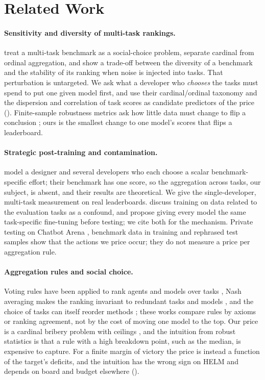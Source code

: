 \section{Related Work}
\label{sec:related}

\paragraph{Sensitivity and diversity of multi-task rankings.}
\citet{zhang2024diversity} treat a multi-task benchmark as a social-choice problem, separate cardinal from ordinal aggregation, and show a trade-off between the diversity of a benchmark and the stability of its ranking when noise is injected into tasks. That perturbation is untargeted. We ask what a developer who \emph{chooses} the tasks must spend to put one given model first, and use their cardinal/ordinal taxonomy and the dispersion and correlation of task scores as candidate predictors of the price (). Finite-sample robustness metrics ask how little data must change to flip a conclusion \citep{broderick2020dropping}; ours is the smallest change to one model's scores that flips a leaderboard.

\paragraph{Strategic post-training and contamination.}
\citet{chen2026incentives} model a designer and several developers who each choose a scalar benchmark-specific effort; their benchmark has one score, so the aggregation across tasks, our subject, is absent, and their results are theoretical. We give the single-developer, multi-task measurement on real leaderboards. \citet{dominguez2024testtask} discuss training on data related to the evaluation tasks as a confound, and \citet{zhang2025trainbeforetest} propose giving every model the same task-specific fine-tuning before testing; we cite both for the mechanism. Private testing on Chatbot Arena \citep{singh2025illusion}, benchmark data in training \citep{zhou2023cheater} and rephrased test samples \citep{yang2023rephrased} show that the actions we price occur; they do not measure a price per aggregation rule.

\paragraph{Aggregation rules and social choice.}
Voting rules have been applied to rank agents and models over tasks \citep{lanctot2023social,rofin2023votenrank}, Nash averaging makes the ranking invariant to redundant tasks and models \citep{balduzzi2018reevaluating}, and the choice of tasks can itself reorder methods \citep{dehghani2021lottery}; these works compare rules by axioms or ranking agreement, not by the cost of moving one model to the top. Our price is a cardinal bribery problem with ceilings \citep{brandt2016comsoc,bredereck2016shift}, and the intuition from robust statistics is that a rule with a high breakdown point, such as the median, is expensive to capture. For a finite margin of victory the price is instead a function of the target's deficits, and the intuition has the wrong sign on HELM and depends on board and budget elsewhere ().
